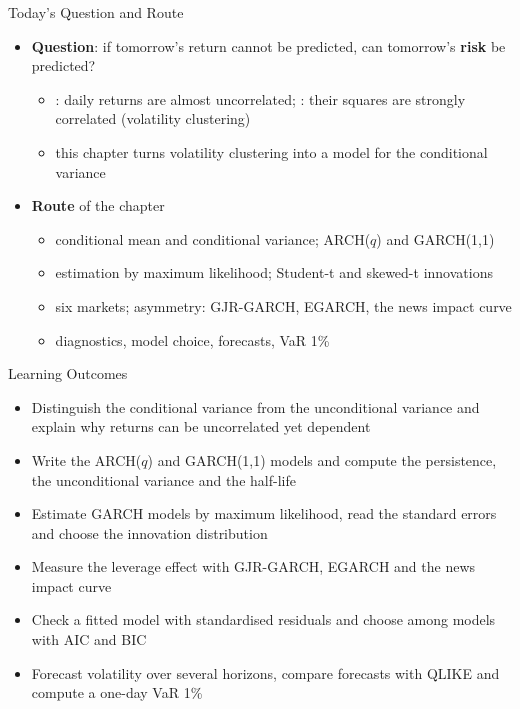 \begin{frame}{Today's Question and Route}
\itemsize{\small}
\begin{itemize}
    \item \textbf{Question}: if tomorrow's return cannot be predicted, can tomorrow's \textbf{risk} be predicted?
    \begin{itemize}
        \item {}: daily returns are almost uncorrelated; : their squares are strongly correlated (volatility clustering)
        \item this chapter turns volatility clustering into a model for the conditional variance
    \end{itemize}
    \item \textbf{Route} of the chapter
    \begin{itemize}
        \item conditional mean and conditional variance; ARCH($q$) and GARCH(1,1)
        \item estimation by maximum likelihood; Student-t and skewed-t innovations
        \item six markets; asymmetry: GJR-GARCH, EGARCH, the news impact curve
        \item diagnostics, model choice, forecasts, VaR 1\%
    \end{itemize}
\end{itemize}
\end{frame}

\begin{frame}{Learning Outcomes}
\itemsize{\small}
\begin{itemize}
    \item Distinguish the conditional variance from the unconditional variance and explain why returns can be uncorrelated yet dependent
    \item Write the ARCH($q$) and GARCH(1,1) models and compute the persistence, the unconditional variance and the half-life
    \item Estimate GARCH models by maximum likelihood, read the standard errors and choose the innovation distribution
    \item Measure the leverage effect with GJR-GARCH, EGARCH and the news impact curve
    \item Check a fitted model with standardised residuals and choose among models with AIC and BIC
    \item Forecast volatility over several horizons, compare forecasts with QLIKE and compute a one-day VaR 1\%
\end{itemize}
\end{frame}

